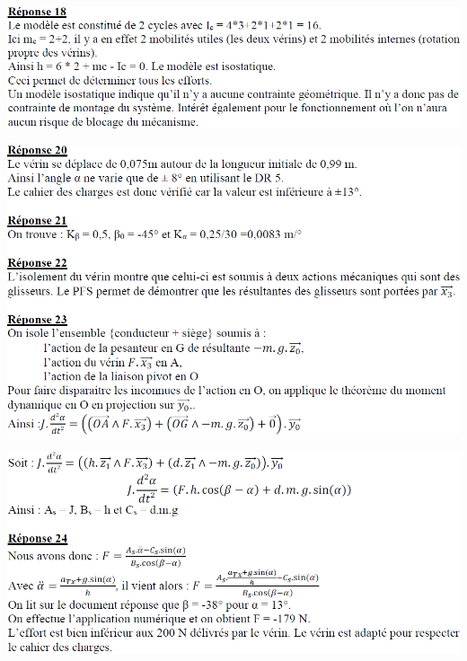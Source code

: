 \documentclass[10pt,fleqn]{article} %
\begin{document}
\newpage

\begin{center}
\includegraphics[width=.8\linewidth]{images/cor_01}
\end{center}

\begin{center}
\includegraphics[width=.8\linewidth]{images/cor_02}
\end{center}


\begin{center}
\includegraphics[width=.8\linewidth]{images/cor_03}
\end{center}
\end{document}
